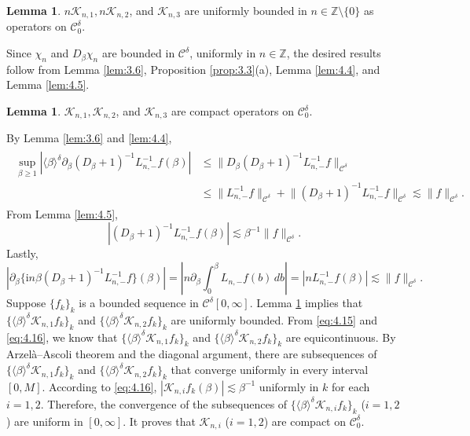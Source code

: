 \documentclass[11pt]{article}
\makeatletter
\renewenvironment{proof}[1][\proofname]{\par
  \vspace{-.7\topsep}%
  \pushQED{\qed}%
  \normalfont
  \topsep0pt \partopsep0pt %
  \trivlist
  \item[\hskip\labelsep
        \itshape
    #1\@addpunct{.}]\ignorespaces
}{%
  \popQED\endtrivlist\@endpefalse
  \addvspace{6pt plus 6pt} %
}
\theoremstyle{definition}
\newtheorem{lemma}[theorem]{Lemma}
\theoremstyle{remark}
\numberwithin{equation}{section}
\newcommand{\mbb}{\mathbb}
\newcommand{\mcal}{\mathcal}
\newcommand{\Z}{\mbb{Z}}
\newcommand{\del}{\partial}
\newcommand{\abs}[1]{\left\lvert #1 \right\rvert}
\newcommand{\norm}[1]{\lVert #1 \rVert}
\makeatother
\begin{document}
\begin{lemma} \label{lem:4.7}
$n\mcal{K}_{n,1}, n\mcal{K}_{n,2}$, and $\mcal{K}_{n,3}$ are uniformly bounded in $n\in \Z\setminus\{0\}$ as operators on $\mcal{C}^\delta_0$.
\end{lemma}
\begin{proof}
Since $\chi_n$ and $D_\beta \chi_n$ are bounded in $\mcal{C}^\delta$, uniformly in $n\in\Z$, the desired results follow from Lemma \ref{lem:3.6}, Proposition \ref{prop:3.3}(a), Lemma \ref{lem:4.4}, and Lemma \ref{lem:4.5}.
\end{proof}

\begin{lemma} \label{lem:4.8}
$\mcal{K}_{n,1}, \mcal{K}_{n,2}$, and $\mcal{K}_{n,3}$ are compact operators on $\mcal{C}^\delta_0$.
\end{lemma}
\begin{proof}
By Lemma \ref{lem:3.6} and \ref{lem:4.4},
\begin{align} \label{eq:4.15} \begin{split}
\sup_{\beta \geq 1} |\langle \beta \rangle^\delta \del_\beta (D_\beta + 1)^{-1} L_{n,-}^{-1} f(\beta)| &\leq \norm{D_\beta (D_\beta + 1)^{-1} L_{n,-}^{-1} f}_{\mcal{C}^\delta} \\
&\leq \norm{L_{n,-}^{-1} f}_{\mcal{C}^\delta} + \norm{(D_\beta + 1)^{-1} L_{n,-}^{-1} f}_{\mcal{C}^\delta} \lesssim \norm{f}_{\mcal{C}^\delta}.
\end{split} \end{align}
From Lemma \ref{lem:4.5},
\begin{equation} \label{eq:4.16}
|(D_\beta + 1)^{-1} L_{n,-}^{-1} f(\beta)| \lesssim \beta^{-1} \norm{f}_{\mcal{C}^\delta}.
\end{equation}
Lastly,
\begin{equation} \label{eq:4.17}
\abs{\del_\beta \big\{ \textrm{i}n \beta (D_\beta + 1)^{-1} L_{n,-}^{-1} f \big\}(\beta)} = \abs{n \del_\beta \int_0^\beta L_{n,-} f(b) \,db} = |n L_{n,-}^{-1} f(\beta)| \lesssim \norm{f}_{\mcal{C}^\delta}.
\end{equation}
Suppose $\{f_k\}_k$ is a bounded sequence in $\mcal{C}^\delta[0,\infty]$. Lemma \ref{lem:4.7} implies that $\{\langle \beta \rangle^\delta \mcal{K}_{n,1} f_k\}_k$ and $\{\langle \beta \rangle^\delta \mcal{K}_{n,2} f_k\}_k$ are uniformly bounded. From \eqref{eq:4.15} and \eqref{eq:4.16}, we know that $\{\langle \beta \rangle^\delta \mcal{K}_{n,1} f_k\}_k$ and $\{\langle \beta \rangle^\delta \mcal{K}_{n,2} f_k\}_k$ are equicontinuous. By Arzelà–Ascoli theorem and the diagonal argument, there are subsequences of $\{\langle \beta \rangle^\delta \mcal{K}_{n,1} f_k\}_k$ and $\{\langle \beta \rangle^\delta \mcal{K}_{n,2} f_k\}_k$ that converge uniformly in every interval $[0,M]$. According to \eqref{eq:4.16}, $|\mcal{K}_{n,i} f_k(\beta)| \lesssim \beta^{-1}$ uniformly in $k$ for each $i=1,2$. Therefore, the convergence of the subsequences of $\{\langle \beta \rangle^\delta \mcal{K}_{n,i} f_k\}_k$ ($i=1,2$) are uniform in $[0,\infty]$. It proves that $\mcal{K}_{n,i}$ ($i=1,2$) are compact on $\mcal{C}^\delta_0$.


\end{proof}
\end{document}
